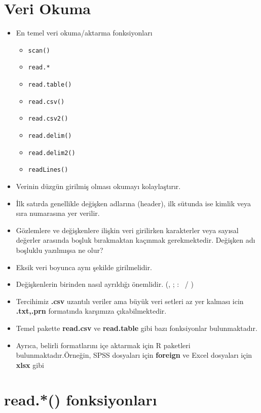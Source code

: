 \documentclass[
  oneside]{book}
\providecommand{\tightlist}{%
  \setlength{\itemsep}{0pt}\setlength{\parskip}{0pt}}
\begin{document}
\hypertarget{veri-okuma}{%
\section{Veri Okuma}\label{veri-okuma}}

\begin{itemize}
\item
  En temel veri okuma/aktarma fonksiyonları

  \begin{itemize}
  \tightlist
  \item
    \texttt{scan()}
  \item
    \texttt{read.*}
  \item
    \texttt{read.table()}
  \item
    \texttt{read.csv()}
  \item
    \texttt{read.csv2()}
  \item
    \texttt{read.delim()}
  \item
    \texttt{read.delim2()}
  \item
    \texttt{readLines()}
  \end{itemize}
\item
  Verinin düzgün girilmiş olması okumayı kolaylaştırır.
\item
  İlk satırda genellikle değişken adlarına (header), ilk sütunda ise kimlik veya sıra numarasına yer verilir.
\item
  Gözlemlere ve değişkenlere ilişkin veri girilirken karakterler veya sayısal değerler arasında boşluk bırakmaktan kaçınmak gerekmektedir. Değişken adı boşluklu yazılmışsa ne olur?
\item
  Eksik veri boyunca aynı şekilde girilmelidir.
\item
  Değişkenlerin birinden nasıl ayrıldığı önemlidir. (, ; : ~/ )
\item
  Tercihimiz \textbf{.csv} uzantılı veriler ama büyük veri setleri az yer kalması icin \textbf{.txt,.prn} formatında karşımıza çıkabilmektedir.
\item
  Temel pakette \textbf{read.csv} ve \textbf{read.table} gibi bazı fonksiyonlar bulunmaktadır.
\item
  Ayrıca, belirli formatlarını içe aktarmak için R paketleri bulunmaktadır.Örneğin, SPSS dosyaları için \textbf{foreign} ve Excel dosyaları için \textbf{xlsx} gibi
\end{itemize}

\hypertarget{read.-fonksiyonlarux131}{%
\section{read.*() fonksiyonları}\label{read.-fonksiyonlarux131}}
\end{document}
